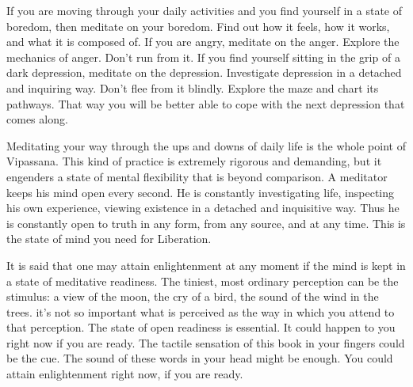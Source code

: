 If you are moving through your daily activities and you find yourself in a state
of boredom, then meditate on your boredom. Find out how it feels, how it works,
and what it is composed of. If you are angry, meditate on the anger. Explore the
mechanics of anger. Don't run from it. If you find yourself sitting in the grip
of a dark depression, meditate on the depression. Investigate depression in a
detached and inquiring way. Don't flee from it blindly. Explore the maze and
chart its pathways. That way you will be better able to cope with the next
depression that comes along.

Meditating your way through the ups and downs of daily life is the whole point
of Vipassana. This kind of practice is extremely rigorous and demanding, but it
engenders a state of mental flexibility that is beyond comparison. A meditator
keeps his mind open every second. He is constantly investigating life,
inspecting his own experience, viewing existence in a detached and inquisitive
way. Thus he is constantly open to truth in any form, from any source, and at
any time. This is the state of mind you need for Liberation.

It is said that one may attain enlightenment at any moment if the mind is kept
in a state of meditative readiness. The tiniest, most ordinary perception can be
the stimulus: a view of the moon, the cry of a bird, the sound of the wind in
the trees. it's not so important what is perceived as the way in which you
attend to that perception. The state of open readiness is essential. It could
happen to you right now if you are ready. The tactile sensation of this book in
your fingers could be the cue. The sound of these words in your head might be
enough. You could attain enlightenment right now, if you are ready.